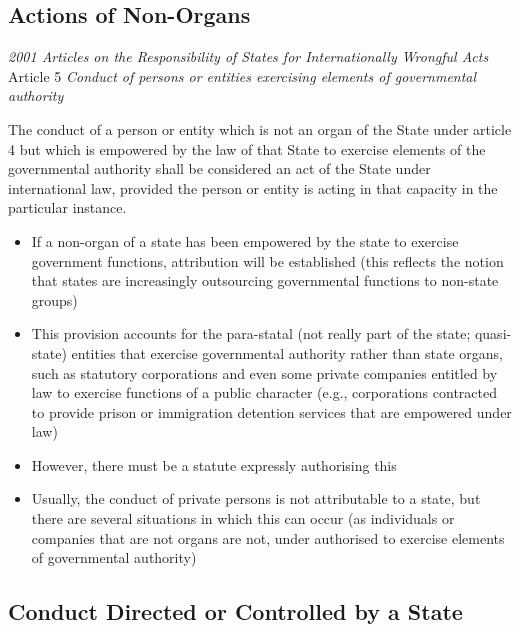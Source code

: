 \subsection{Actions of Non-Organs}

\begin{conventiondetails}{\textit{2001 Articles on the Responsibility of States for Internationally Wrongful Acts} Article 5}
    \flushleft
    \textit{Conduct of persons or entities exercising elements of governmental authority}

    \vspace{\baselineskip}

    The conduct of a person or entity which is not an organ of the State under article 4 but which is empowered by the law of that State to exercise elements of the governmental authority shall be considered an act of the State under international law, provided the person or entity is acting in that capacity in the particular instance.
\end{conventiondetails}

\begin{itemize}
    \item If a non-organ of a state has been empowered by the state to exercise government functions, attribution will be established (this reflects the notion that states are increasingly outsourcing governmental functions to non-state groups)
    \item This provision accounts for the para-statal (not really part of the state; quasi-state) entities that exercise governmental authority rather than state organs, such as statutory corporations and even some private companies entitled by law to exercise functions of a public character (e.g., corporations contracted to provide prison or immigration detention services that are empowered under law)
    \item However, there must be a statute expressly authorising this
    \item Usually, the conduct of private persons is not attributable to a state, but there are several situations in which this can occur (as individuals or companies that are not organs are not, under  authorised to exercise elements of governmental authority)
\end{itemize}

\subsection{Conduct Directed or Controlled by a State}


